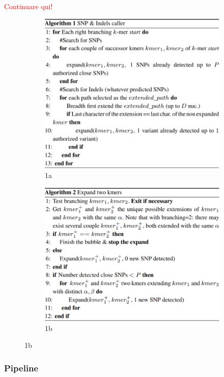 \documentclass[../main.tex]{subfiles}
\begin{document}
\textcolor{red}{Continuare qui!}

\begin{figure}[ht]
\begin{subfigure}{.5\textwidth}
  \centering
  \includegraphics[width=.8\linewidth]{images/discosnp_alg1.png}
  \caption{1a}
  \label{fig:sfig1}
\end{subfigure}
\begin{subfigure}{.5\textwidth}
  \centering
  \includegraphics[width=.8\linewidth]{images/discosnp_alg2.png}
  \caption{1b}
  \label{fig:sfig2}
\end{subfigure}
\end{figure}

\subsubsection{Pipeline}
\end{document}
